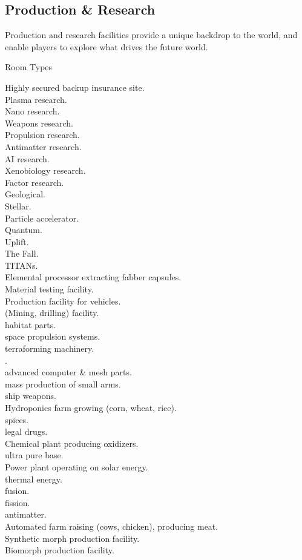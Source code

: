 \documentclass[a4]{article}
\begin{document}
 

\subsection{Production \& Research}

Production and research facilities provide a unique backdrop to the world, and
enable players to explore what drives the future world.

Room Types

\starttableone
Highly secured backup insurance site.\\
Plasma research.\\
Nano research.\\
Weapons research.\\
Propulsion research.\\
Antimatter research.\\
AI research.\\
Xenobiology research.\\
Factor research.\\
Geological.\\
Stellar.\\
Particle accelerator.\\
Quantum.\\
Uplift.\\
The Fall.\\
TITANs.\\
Elemental processor extracting fabber capsules.\\
Material testing facility.\\
Production facility for vehicles.\\
(Mining, drilling) facility.\\
\textellipsis habitat parts.\\
\textellipsis space propulsion systems.\\
\textellipsis terraforming machinery.\\
\textellipsis {}.\\
\textellipsis advanced computer \& mesh parts.\\
\textellipsis mass production of small arms.\\
\textellipsis ship weapons.\\
Hydroponics farm growing (corn, wheat, rice).\\
\textellipsis spices.\\
\textellipsis legal drugs.\\
Chemical plant producing oxidizers.\\
\textellipsis ultra pure  base.\\
Power plant operating on solar energy.\\
\textellipsis thermal energy.\\
\textellipsis fusion.\\
\textellipsis fission.\\
\textellipsis antimatter.\\
Automated farm raising (cows, chicken), producing meat.\\
Synthetic morph production facility.\\
Biomorph production facility.\\
\stoptableone
\end{document}
